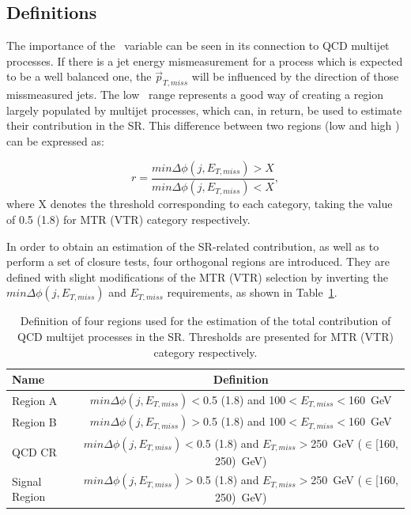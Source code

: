 \subsection{Definitions}

\hspace{10pt} The importance of the \mindphi~variable can be seen in its connection to QCD multijet processes. If there is a jet energy mismeasurement for a process which is expected to be a well balanced one, the $\vec{p}_{T,miss}$ will be influenced by the direction of those missmeasured jets. The low \mindphi~range represents a good way of creating a region largely populated by multijet processes, which can, in return, be used to estimate their contribution in the SR. This difference between two regions (low and high \mindphi) can be expressed as:

\begin{equation}
    r = \frac{min\Delta\phi(j, E_{T,miss})>X}{min\Delta\phi(j, E_{T,miss})<X},
\end{equation}
where X denotes the threshold corresponding to each category, taking the value of 0.5 (1.8) for MTR (VTR) category respectively.

\hspace{10pt} In order to obtain an estimation of the SR-related contribution, as well as to perform a set of closure tests, four orthogonal regions are introduced. They are defined with slight modifications of the MTR (VTR) selection by inverting the $min\Delta\phi(j, E_{T,miss})$ and $E_{T,miss}$ requirements, as shown in Table~\ref{tab:QCD_regions}.

\begin{table}[htbp]
\centering
\small
\begin{tabular}{lc}
\hline\hline
Name & Definition\\\hline
Region A &  $min\Delta\phi(j, E_{T,miss})<$0.5 (1.8) and 100$<E_{T,miss}<$160~GeV \\
Region B & $min\Delta\phi(j, E_{T,miss})>$0.5 (1.8) and 100$<E_{T,miss}<$160~GeV   \\
QCD CR   & $min\Delta\phi(j, E_{T,miss})<$0.5 (1.8) and $E_{T,miss}>$250~GeV ($\in$[160, 250)~GeV)   \\
Signal Region &  $min\Delta\phi(j, E_{T,miss})>$0.5 (1.8) and $E_{T,miss}>$250~GeV ($\in$[160, 250)~GeV)   \\

\hline\hline
\end{tabular}
\caption{Definition of four regions used for the estimation of the total contribution of QCD multijet processes in the SR. Thresholds are presented for MTR (VTR) category respectively.\label{tab:QCD_regions} }
\end{table}

